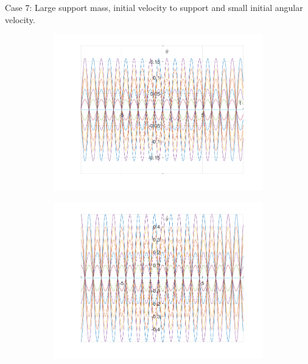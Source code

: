 \documentclass{article}
\begin{document}
	Case 7:
	Large support mass, initial velocity to support and small initial angular velocity.
			\begin{figure}[h!]
		\centering
		\begin{subfigure}[b]{0.48\linewidth}
			\includegraphics[width=\linewidth]{./SmallOscillations/S7/F1.png}
		\end{subfigure}
		\begin{subfigure}[b]{0.48\linewidth}
			\includegraphics[width=\linewidth]{./SmallOscillations/S7/F2.png}
		\end{subfigure}
	\end{figure}
\end{document}
